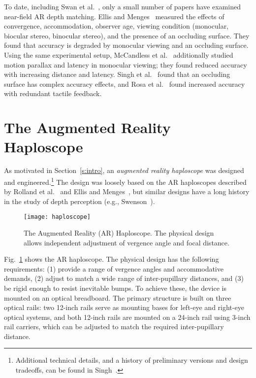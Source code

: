 \documentclass[10pt,journal,compsoc]{IEEEtran}
\makeatletter
\newlength{\FigWidth}
\newcommand{\etal}{et al.\@\xspace} %
\makeatother
\begin{document}
To date, including Swan \etal~\cite{swan:2015}, only a small number of papers have examined near-field AR depth matching.
Ellis and Menges~\cite{ellis:1998} measured the effects of convergence, accommodation, observer age, viewing condition (monocular, biocular stereo, binocular stereo), and the presence of an occluding surface.  They found that accuracy is degraded by monocular viewing and an occluding surface. 
Using the same experimental setup, McCandless \etal~\cite{mccandless:2000} additionally studied motion parallax and latency in monocular viewing; they found reduced accuracy with increasing distance and latency.  
Singh \etal~\cite{singh:2010} found that an occluding surface has complex accuracy effects, 
and Rosa \etal~\cite{rosa:2016} found increased accuracy with redundant tactile feedback. 

\section {The Augmented Reality Haploscope}
\label{s:haplo}



As motivated in Section~\ref{s:intro}, an \emph{augmented reality haploscope} was designed and engineered.\footnote{%
Additional technical details, and a history of preliminary versions and design tradeoffs, can be found in Singh~\cite{singh:2013}.}
The design was loosely based on the AR haploscopes described by Rolland \etal\ \cite{rolland:1995} and Ellis and Menges~\cite{ellis:1998}, but similar designs have a long history in the study of depth perception (e.g., Swenson~\cite{swenson:1932}).  

\begin{figure}[!t]
\centering
\texttt{[image: haploscope]}
\caption{The Augmented Reality (AR) Haploscope.  The physical design allows independent adjustment of vergence angle and focal distance.}
\label{f:haplo}
\end{figure}


Fig.~\ref{f:haplo} shows the AR haploscope.  The physical design has the following requirements: (1) provide a range of vergence angles and accommodative demands, (2) adjust to match a wide range of inter-pupillary distances, and (3) be rigid enough to resist inevitable bumps.  To achieve these, the device is mounted on an optical breadboard. 
The primary structure is built on three 
optical rails: two 12-inch rails serve as mounting bases for left-eye and right-eye optical systems, and both 12-inch rails are mounted on a 24-inch rail using 3-inch rail carriers, which can be adjusted to match the required inter-pupillary distance. 
\end{document}
